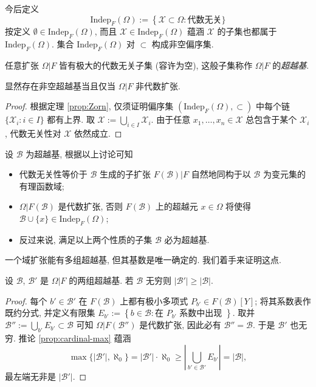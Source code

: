 今后定义
\[ \text{Indep}_F(\Omega) := \left\{ \mathcal{X} \subset \Omega: \text{代数无关} \}\right. \]
按定义 $\emptyset \in \text{Indep}_F(\Omega)$, 而且 $\mathcal{X} \in \text{Indep}_F(\Omega)$ 蕴涵 $\mathcal{X}$ 的子集也都属于 $\text{Indep}_F(\Omega)$. 集合 $\text{Indep}_F(\Omega)$ 对 $\subset$ 构成非空偏序集.

\begin{definition-theorem}
	任意扩张 $\Omega|F$ 皆有极大的代数无关子集 (容许为空), 这般子集称作 $\Omega|F$ 的\emph{超越基}.
\end{definition-theorem}
显然存在非空超越基当且仅当 $\Omega|F$ 非代数扩张.
\begin{proof}
	根据定理 \ref{prop:Zorn}, 仅须证明偏序集 $(\text{Indep}_F(\Omega), \subset)$ 中每个链 $\{ \mathcal{X}_i: i \in I\}$ 都有上界. 取 $\mathcal{X} := \bigcup_{i \in I} \mathcal{X}_i$. 由于任意 $x_1, \ldots, x_n \in \mathcal{X}$ 总包含于某个 $\mathcal{X}_i$, 代数无关性对 $\mathcal{X}$ 依然成立.
\end{proof}

设 $\mathcal{B}$ 为超越基, 根据以上讨论可知
\begin{itemize}
	\item 代数无关性等价于 $\mathcal{B}$ 生成的子扩张 $F(\mathcal{B})|F$ 自然地同构于以 $\mathcal{B}$ 为变元集的有理函数域;
	\item $\Omega|F(\mathcal{B})$ 是代数扩张, 否则 $F(\mathcal{B})$ 上的超越元 $x \in \Omega$ 将使得 $\mathcal{B} \cup \{x\} \in \text{Indep}_F(\Omega)$;
	\item 反过来说, 满足以上两个性质的子集 $\mathcal{B}$ 必为超越基.
\end{itemize}

一个域扩张能有多组超越基, 但其基数是唯一确定的. 我们着手来证明这点.
\begin{lemma}\label{prop:generator-cardinal-field}
	设 $\mathcal{B}$, $\mathcal{B}'$ 是 $\Omega|F$ 的两组超越基. 若 $\mathcal{B}$ 无穷则 $|\mathcal{B}'| \geq |\mathcal{B}|$.
\end{lemma}
\begin{proof}
	每个 $b' \in \mathcal{B}'$ 在 $F(\mathcal{B})$ 上都有极小多项式 $P_{b'} \in F(\mathcal{B})[Y]$; 将其系数表作既约分式, 并定义有限集 $E_{b'} := \left\{ b \in \mathcal{B}: \text{在 $P_{b'}$ 系数中出现 } \right\}$. 取并 $\mathcal{B}'' := \bigcup_{b'} E_{b'} \subset \mathcal{B}$ 可知 $\Omega|F(\mathcal{B}'')$ 是代数扩张, 因此必有 $\mathcal{B}''=\mathcal{B}$. 于是 $\mathcal{B}'$ 也无穷. 推论 \ref{prop:cardinal-max} 蕴涵
	\[ \max\{|\mathcal{B}'|, \aleph_0 \} = |\mathcal{B}'| \cdot \aleph_0 \geq \left| \bigcup_{b' \in \mathcal{B}'} E_{b'} \right| = |\mathcal{B}|, \]
	最左端无非是 $|\mathcal{B}'|$.
\end{proof}


